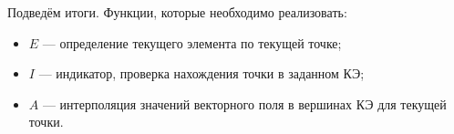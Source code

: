 Подведём итоги. Функции, которые необходимо реализовать:
\begin{itemize}
	\item $E$ --- определение текущего элемента по текущей точке;
	\item $I$ --- индикатор, проверка нахождения точки в заданном КЭ;
	\item $A$ --- интерполяция значений векторного поля в вершинах КЭ для текущей точки.
\end{itemize}

